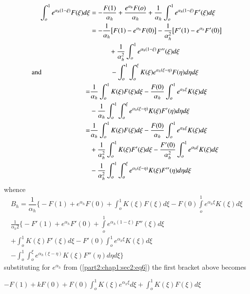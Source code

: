 \begin{align*}
\int^1_o e^{\alpha_h (1 - \xi)} F(\xi) d \xi & = -
  \frac{F(1)}{\alpha_h} + \frac{e^{\alpha_h} F(o)}{\alpha _h} +
  \frac{1}{\alpha_h} \int^{1}_o e^{\alpha_h (1 - \xi)} F' (\xi) d
  \xi\\ 
  & = - \frac{1}{\alpha_h} \big[ F(1) - e^{\alpha_{h}} F (0) \big] -
  \frac{1}{\alpha_h^2} \big[F' (1) - e^{\alpha_ h} F' (0) \big]\\ 
  & \hspace{1cm}+ \frac{1}{\alpha_h^2} \int^1_o e^{\alpha_h (1 - \xi)}
  F'' (\xi ) d  \xi\\ 
  \text{and}  \hspace{2.5cm}& \quad \qquad - \int^1_o \int^\xi_o K
  (\xi) e^{\alpha_h (\xi - \eta)} F (\eta) d \eta d \xi\hspace{1cm} \\ 
  =& \frac{1}{\alpha_h} \int^1_o K (\xi) F (\xi) d \xi - \frac{F
    (0)}{\alpha_h} \int^1_o e^{\alpha_h \xi} K (\xi) d \xi\\ 
  & - \frac{1}{\alpha_h} \int^1_o \int^\xi_o e^{\alpha_h (\xi - \eta)}
  K(\xi) F' (\eta) d \eta d \xi\\ 
  =& \frac{1}{\alpha_h} \int^1_o K (\xi) F (\xi ) d \xi - \frac{F
    (0)}{\alpha_h} \int^1_o e^{\alpha_h \xi} K (\xi) d \xi\\ 
  & + \frac{1}{\alpha_h^2} \int^1_o K (\xi) F' (\xi) d \xi - \frac{F'
    (0)}{\alpha_h^2} \int^1_o e^{\alpha_h \xi} K (\xi) d \xi\\ 
  & - \frac{1}{\alpha_h^2} \int^1_o \int^\xi_o e^{\alpha_h (\xi -
    \eta)} K (\xi) F'' (\eta) d \eta d \xi 
\end{align*}
whence\pageoriginale 
\begin{multline*}
  B_h = \dfrac{1}{\alpha_h} \Bigg\{- F (1) + e^{\alpha _h}  F
  (0) + \int^1_o K (\xi) F (\xi) d \xi - F (0) \int\limits^{1}_o
  e^{\alpha_h \xi} K (\xi) d \xi\\
  \frac{1}{\alpha_h 2} \Bigg\{ - F' (1) + e^{\alpha_h} F' (0) +
  \int\limits^{1}_o e^{\alpha_h (1 - \xi)} F'' (\xi) d  \xi\\ 
   + \int^1_o K (\xi) F' (\xi) d \xi - F' (0) \int^1_o e^{\alpha_h
    \xi} K (\xi) d \xi\\ 
   - \int^1_o \int^\xi_o e^{\alpha_h (\xi - \eta)} K(\xi)F '' (\eta)
   d \eta d \xi \Bigg\} 
\end{multline*}
substituting for $e^{\alpha_h}$ from (\ref{part2:chap1:sec2:eq6}) the
first bracket above becomes 

 $- F (1) + k F (0) + F (0) \int^1_o K (\xi) e^{\alpha_h \xi} d \xi +
\int^1_o K (\xi) F (\xi) d \xi$  
 
